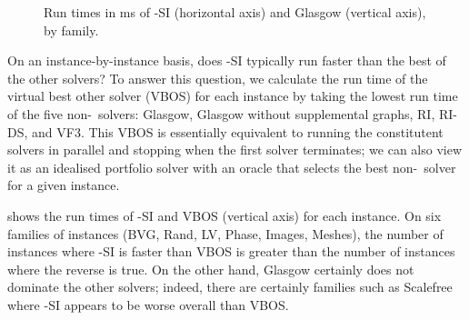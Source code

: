 \begin{figure}[htb]
    \caption{Run times in ms of \McSplit-SI (horizontal axis) and Glasgow (vertical axis), by family.}
    \label{figure:mcsplitsi-scatter-by-family}
\end{figure}

On an instance-by-instance basis, does \McSplit-SI typically run faster than
the best of the other solvers? To answer this question, we calculate the run
time of the virtual best other solver (VBOS) for each instance
by taking the lowest run time
of the five non-\McSplit\ solvers: Glasgow, Glasgow without supplemental graphs, RI, RI-DS, and VF3.
This VBOS is essentially equivalent to running the constitutent solvers in parallel
and stopping when the first solver terminates; we can also view it
as an idealised portfolio solver with an oracle that selects
the best non-\McSplit\ solver for a given instance.

 shows the run times of \McSplit-SI
and VBOS (vertical axis) for each instance.  On six families
of instances (BVG, Rand, LV, Phase, Images, Meshes), the number
of instances where \McSplit-SI is faster than VBOS is greater than the number of instances where
the reverse is true. 
On the other hand, Glasgow certainly does not dominate the other solvers;
indeed, there are certainly families such as Scalefree
where \McSplit-SI appears to be worse overall than VBOS.

